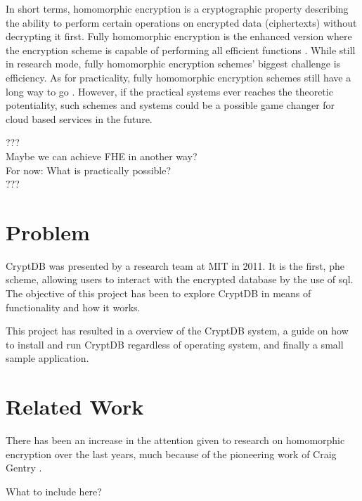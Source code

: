 In short terms, homomorphic encryption is a cryptographic property describing the ability to perform certain operations on encrypted data (ciphertexts) without decrypting it first. Fully homomorphic encryption is the enhanced version where the encryption scheme is capable of performing all efficient functions \cite{Gentry_thesis}. While still in research mode, fully homomorphic encryption schemes' biggest challenge is efficiency. As for practicality, fully homomorphic encryption schemes still have a long way to go \cite{naehrig2011can}. However, if the practical systems ever reaches the theoretic potentiality, such schemes and systems could be a possible game changer for cloud based services in the future.

\noindent
???\\
Maybe we can achieve FHE in another way?\\
For now: What is practically possible?\\
???
\section{Problem}

CryptDB was presented by a research team at MIT in 2011. It is the first, \gls{phe} scheme,  allowing users to interact with the encrypted database by the use of \gls{sql}. %
The objective of this project has been to explore CryptDB in means of functionality and how it works. 

This project has resulted in a overview of the CryptDB system, a guide on how to install and run CryptDB regardless of operating system, and finally a small sample application.

\section{Related Work}

There has been an increase in the attention given to research on homomorphic encryption over the last years, much because of the pioneering work of Craig Gentry \citep{Gentry_thesis} \cite{Gentry_first_lattices} \cite{Gentry_computing_arb_func_enc_data}.


What to include here?